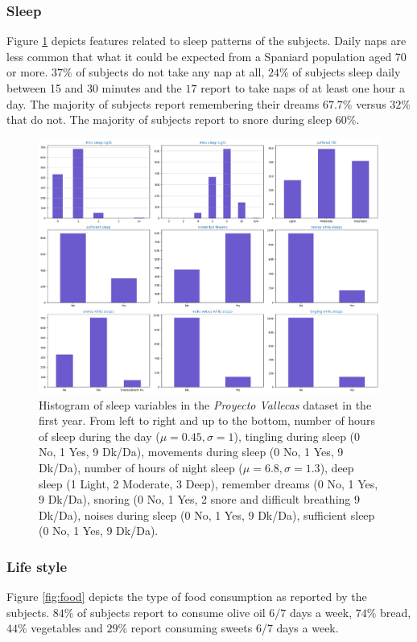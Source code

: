 \documentclass[11pt]{article}
\theoremstyle{definition}
\theoremstyle{remark}
\begin{document}
\subsubsection{Sleep}
\label{ssse:sleep}

Figure \ref{fig:sleep} depicts features related to sleep patterns of the subjects. Daily naps are less common that what it could be expected from a Spaniard population aged 70 or more. $37\%$ of subjects do not take any nap at all, $24\%$ of subjects sleep daily between 15 and 30 minutes and the $17$ report to take naps of at least one hour a day. The majority of subjects report remembering their dreams $67.7\%$ versus $32\%$ that do not. The majority of subjects report to snore during sleep $60\%$. 
\begin{figure}[H]
        \centering
        \includegraphics[keepaspectratio, width=\linewidth]{figures/Fig_sleep}
        \caption{Histogram of sleep variables in the \emph{Proyecto Vallecas} dataset in the first year. From left to right and up to the bottom, number of hours of sleep during the day ($\mu=0.45, \sigma=1$), tingling during sleep (0 No, 1 Yes, 9 Dk/Da), movements during sleep (0 No, 1 Yes, 9 Dk/Da), number of hours of night sleep ($\mu=6.8, \sigma=1.3$), deep sleep (1 Light, 2 Moderate, 3 Deep), remember dreams (0 No, 1 Yes, 9 Dk/Da), snoring (0 No, 1 Yes, 2 snore and difficult breathing 9 Dk/Da), noises during sleep (0 No, 1 Yes, 9 Dk/Da), sufficient sleep (0 No, 1 Yes, 9 Dk/Da).} 
        \label{fig:sleep}
\end{figure}


\subsubsection{Life style}
\label{ssse:life}
Figure \ref{fig:food} depicts the type of food consumption as reported by the subjects. $84\%$ of subjects report to consume olive oil $6/7$ days a week, $74\%$ bread, $44\%$ vegetables and $29\%$ report consuming sweets 6/7 days a week.
\end{document}
